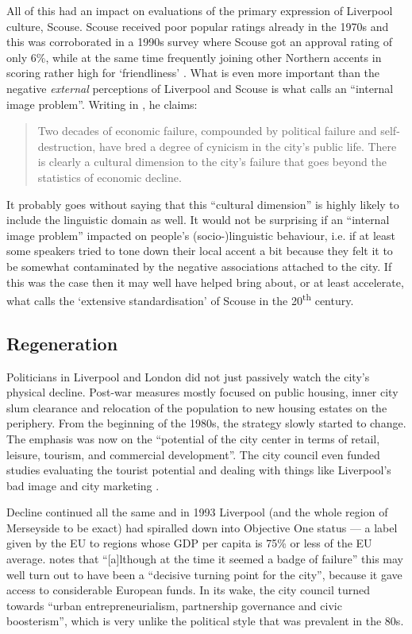 All of this had an impact on evaluations of the primary expression of Liverpool culture, Scouse.
Scouse received poor popular ratings already in the 1970s and this was corroborated in a 1990s survey where Scouse got an approval rating of only 6\%, while at the same time frequently joining other Northern accents in scoring rather high for `friendliness' \citep[cf.][166]{wales2006}.
What is even more important than the negative \emph{external} perceptions of Liverpool and Scouse is what \citet[255]{parkinson1990} calls an ``internal image problem''.
Writing in \citeyear{parkinson1990}, he claims: 
	\begin{quote}
		Two decades of economic failure, compounded by political failure and self-destruction, have bred a degree of cynicism in the city's public life. There is clearly a cultural dimension to the city's failure that goes beyond the statistics of economic decline.
	\end{quote}
It probably goes without saying that this ``cultural dimension'' is highly likely to include the linguistic domain as well.
It would not be surprising if an ``internal image problem'' impacted on people's (socio-)linguistic behaviour, i.e. if at least some speakers tried to tone down their local accent a bit because they felt it to be somewhat contaminated by the negative associations attached to the city.
If this was the case then it may well have helped bring about, or at least accelerate, what \citet{knowles1978} calls the `extensive standardisation' of Scouse in the 20\textsuperscript{th} century.

		\subsection{Regeneration}\label{sec.hist.20.regen}

Politicians in Liverpool and London did not just passively watch the city's physical decline.
Post-war measures mostly focused on public housing, inner city slum clearance and relocation of the population to new housing estates on the periphery.
From the beginning of the 1980s, the strategy slowly started to change.
The emphasis was now on the ``potential of the city center in terms of retail, leisure, tourism, and commercial development''.
The city council even funded studies evaluating the tourist potential and dealing with things like Liverpool's bad image and city marketing \citep[cf.][250--253]{parkinson1990}.

Decline continued all the same and in 1993 Liverpool (and the whole region of Merseyside to be exact) had spiralled down into Objective One status --- a label given by the EU to regions whose GDP per capita is 75\% or less of the EU average.
\citet[53--54]{belchem2006a} notes that ``[a]lthough at the time it seemed a badge of failure'' this may well turn out to have been a ``decisive turning point for the city'', because it gave access to considerable European funds.
In its wake, the city council turned towards ``urban entrepreneurialism, partnership governance and civic boosterism'', which is very unlike the political style that was prevalent in the 80s.

